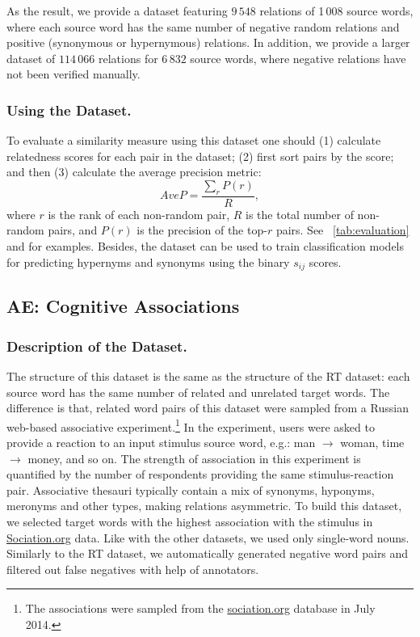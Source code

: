 \documentclass[runningheads,a4paper]{llncs}
\begin{document}
As the result, we provide a dataset featuring $9\,548$ relations of 1\,008 source words, where  each source word has the same number of negative random relations and positive (synonymous or hypernymous) relations. In addition, we provide a larger dataset of $114\,066$ relations for $6\,832$ source words, where negative relations have not been verified manually.

\subsubsection{Using the Dataset.} To evaluate a similarity measure using this dataset one should (1) calculate relatedness scores for each pair in the dataset; (2) first sort pairs by the score; and then (3) calculate the average precision metric: 
$$
AveP = \frac{\sum_r P(r)}{R},
$$
where $r$ is the rank of each non-random pair, $R$ is the total number of non-random pairs, and $P(r)$ is the precision of the top-$r$ pairs. See \tablename~\ref{tab:evaluation} and \cite{Panchenko:15} for examples. Besides, the dataset can be used to train classification models for predicting hypernyms and synonyms using the binary $s_{ij}$ scores. 

\subsection{AE: Cognitive Associations}\label{sub:ae}

\subsubsection{Description of the Dataset.} The structure of this dataset is the same as the structure of the RT dataset: each source word has the same number of related and unrelated target words. The difference is that, related word pairs of this dataset were sampled from a Russian web-based associative experiment.\footnote{The associations were sampled from the \url{sociation.org} database in July 2014. } In the experiment, users were asked to provide a reaction to an input stimulus source word, e.g.: man $\rightarrow$ woman, time $\rightarrow$ money, and so on. The strength of association in this experiment is quantified by the number of respondents providing the same stimulus-reaction pair. Associative thesauri typically contain a mix of synonyms, hyponyms, meronyms and other types, making relations asymmetric. To build this dataset, we  selected target words with the highest association with the stimulus in \url{Sociation.org} data. Like with the other datasets, we used only single-word nouns. Similarly to the RT dataset, we automatically generated negative word pairs and filtered out false negatives with help of annotators.
\end{document}
